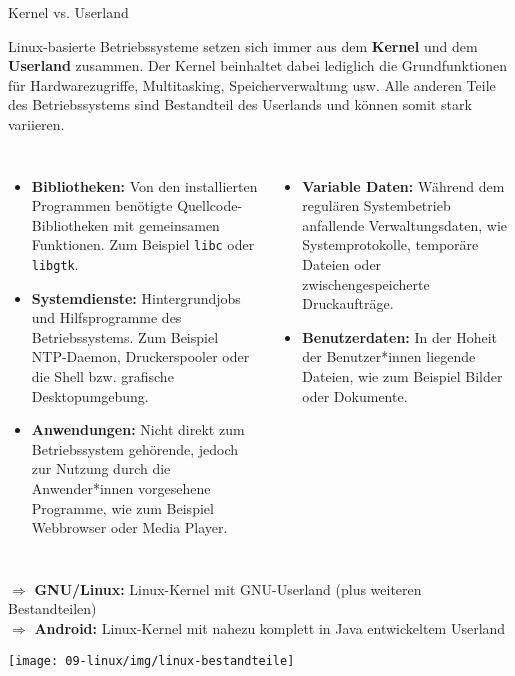 {
\footnotesize
\setlength{\leftmargini}{1.2em}

\begin{frame}{Kernel vs. Userland}
    \parbox{\linewidth}{
        Linux-basierte Betriebssysteme setzen sich immer aus dem \textbf{Kernel}
        und dem \textbf{Userland} zusammen. Der Kernel beinhaltet dabei lediglich
        die Grundfunktionen für Hardwarezugriffe, Multitasking, Speicherverwaltung
        usw. Alle anderen Teile des Betriebssystems sind Bestandteil des Userlands
        und können somit stark variieren.
    }

    \vfill

    {
        \scriptsize

        \begin{columns}[T,onlytextwidth]
            \begin{itemize}
                \justifying

                \item \textbf{Bibliotheken:} Von den installierten Programmen
                benötigte Quellcode-Bibliotheken mit gemeinsamen Funktionen.
                Zum Beispiel \texttt{libc} oder \texttt{libgtk}.

                \item \textbf{Systemdienste:} Hintergrundjobs und Hilfsprogramme des
                Betriebssystems. Zum Beispiel NTP-Daemon, Druckerspooler oder die
                Shell bzw. grafische Desktopumgebung.

                \item \textbf{Anwendungen:} Nicht direkt zum Betriebssystem gehörende,
                jedoch zur Nutzung durch die Anwender*innen vorgesehene Programme, wie
                zum Beispiel Webbrowser oder Media Player.
            \end{itemize}

            \begin{itemize}
                \justifying

                \item \textbf{Variable Daten:} Während dem regulären Systembetrieb
                anfallende Verwaltungsdaten, wie Systemprotokolle, temporäre Dateien
                oder zwischengespeicherte Druckaufträge.

                \item \textbf{Benutzerdaten:} In der Hoheit der Benutzer*innen liegende
                Dateien, wie zum Beispiel Bilder oder Dokumente.
            \end{itemize}
        \end{columns}
    }

    \vfill
    $\Rightarrow$ \textbf{GNU/Linux:} Linux-Kernel mit GNU-Userland (plus weiteren Bestandteilen) \\
    $\Rightarrow$ \textbf{Android:} Linux-Kernel mit nahezu komplett in Java entwickeltem Userland

    \vfill
    \texttt{[image: 09-linux/img/linux-bestandteile]}
\end{frame}
}


